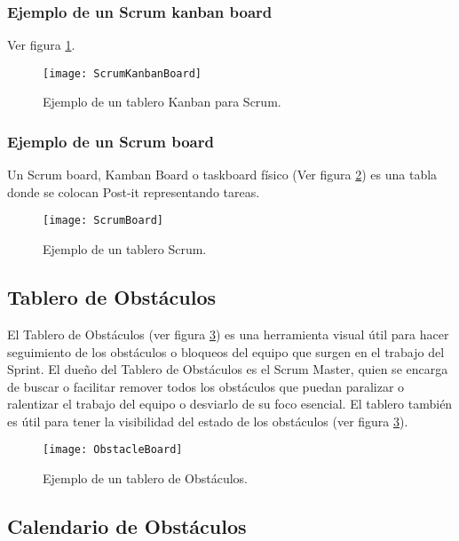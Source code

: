 \subsubsection{Ejemplo de un Scrum kanban board}

Ver figura \ref{fig:ScrumKanbanBoard}.

\begin{figure}[h]
  \centering
  \texttt{[image: ScrumKanbanBoard]}
  \caption{Ejemplo de un tablero Kanban para Scrum.}
  \centering
  \label{fig:ScrumKanbanBoard} %
\end{figure}

\subsubsection{Ejemplo de un Scrum board}

Un Scrum board, Kamban Board o taskboard físico (Ver figura \ref{fig:ScrumBoard}) es una tabla donde se colocan Post-it representando tareas.

\begin{figure}[h]
  \centering
  \texttt{[image: ScrumBoard]}
  \caption{Ejemplo de un tablero Scrum.}
  \centering
  \label{fig:ScrumBoard} %
\end{figure}

\subsection{Tablero de Obstáculos}

El Tablero de Obstáculos (ver figura \ref{fig:ObstacleBoard}) es una herramienta visual útil para hacer seguimiento de los obstáculos o bloqueos del equipo que surgen en el trabajo del Sprint. El dueño del Tablero de Obstáculos es el Scrum Master, quien se encarga de buscar o facilitar remover todos los obstáculos que puedan paralizar o ralentizar el trabajo del equipo o desviarlo de su foco esencial. El tablero también es útil para tener la visibilidad del estado de los obstáculos (ver figura \ref{fig:ObstacleBoard}).

\begin{figure}[h]
  \centering
  \texttt{[image: ObstacleBoard]}
  \caption{Ejemplo de un tablero de Obstáculos.}
  \centering
  \label{fig:ObstacleBoard} %
\end{figure}

\subsection{Calendario de Obstáculos}


